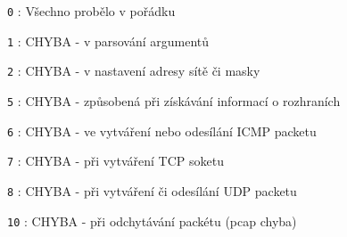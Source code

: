 	\texttt{0} : Všechno probělo v pořádku
	
	\texttt{1} : CHYBA - v parsování argumentů
	
	\texttt{2} : CHYBA - v nastavení adresy sítě či masky
	\newline
	
	\texttt{5} : CHYBA - způsobená při získávání informací o rozhraních
	
	\texttt{6} : CHYBA - ve vytváření nebo odesílání ICMP packetu
	
	\texttt{7} : CHYBA - při vytváření TCP soketu 
	
	\texttt{8} : CHYBA - při vytváření či odesílání UDP packetu
	\newline
	
	\texttt{10} : CHYBA - při odchytávání packétu (pcap chyba)
	
	




